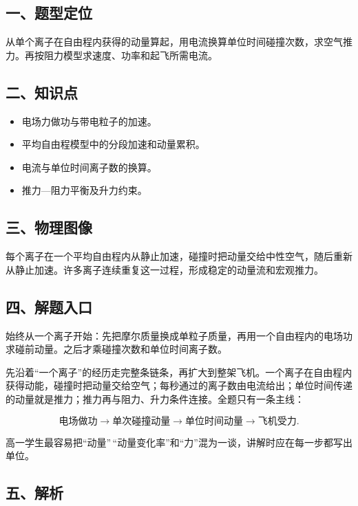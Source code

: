 \documentclass[12pt,a4paper,UTF8]{ctexart}
\newcommand{\tightlist}{\setlength{\itemsep}{0pt}\setlength{\parskip}{0pt}}
\begin{document}
\subsection{一、题型定位}\label{ux4e00ux9898ux578bux5b9aux4f4d-3}

从单个离子在自由程内获得的动量算起，用电流换算单位时间碰撞次数，求空气推力。再按阻力模型求速度、功率和起飞所需电流。

\subsection{二、知识点}\label{ux4e8cux77e5ux8bc6ux70b9-3}

\begin{itemize}
\tightlist
\item
  电场力做功与带电粒子的加速。
\item
  平均自由程模型中的分段加速和动量累积。
\item
  电流与单位时间离子数的换算。
\item
  推力---阻力平衡及升力约束。
\end{itemize}

\subsection{三、物理图像}\label{ux4e09ux7269ux7406ux56feux50cf-3}

每个离子在一个平均自由程内从静止加速，碰撞时把动量交给中性空气，随后重新从静止加速。许多离子连续重复这一过程，形成稳定的动量流和宏观推力。

\subsection{四、解题入口}\label{ux56dbux89e3ux9898ux5165ux53e3-3}

始终从一个离子开始：先把摩尔质量换成单粒子质量，再用一个自由程内的电场功求碰前动量。之后才乘碰撞次数和单位时间离子数。

先沿着``一个离子''的经历走完整条链条，再扩大到整架飞机。一个离子在自由程内获得动能，碰撞时把动量交给空气；每秒通过的离子数由电流给出；单位时间传递的动量就是推力；推力再与阻力、升力条件连接。全题只有一条主线：

\[\text{电场做功}\to\text{单次碰撞动量}\to\text{单位时间动量}\to\text{飞机受力}.\]

高一学生最容易把``动量''\,``动量变化率''和``力''混为一谈，讲解时应在每一步都写出单位。

\subsection{五、解析}\label{ux4e94ux89e3ux6790-3}
\end{document}
